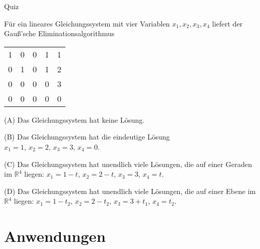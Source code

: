 \documentclass[german]{beamer}
\begin{document}
\begin{frame}{Quiz}

F\"ur ein lineares Gleichungssystem mit vier Variablen $x_1, x_2, x_3, x_4$
liefert der Gau{\ss}'sche Eliminationsalgorithmus
\begin{center}
\begin{tabular}{rrrr|r}
 1 &  0 &  0 & 1 & 1 \\
 0 &  1 &  0 & 1 & 2 \\
 0 &  0 &  0 & 0 & 3\\
 0 &  0 &  0 & 0 & 0\\
\end{tabular}
\end{center}

{\small
\vspace*{2mm}
(A) Das Gleichungssystem hat keine L\"osung.

\vspace*{2mm}
(B) Das Gleichungssystem hat die eindeutige L\"osung \\ $x_1=1$, $x_2=2$, $x_3=3$, $x_4=0$.

\vspace*{2mm}
(C) Das Gleichungssystem hat unendlich viele L\"osungen, die auf einer Geraden im $\mathbb{R}^4$ liegen:
$x_1=1-t$, $x_2=2-t$, $x_3=3$, $x_4=t$.

\vspace*{2mm}
(D) Das Gleichungssystem hat unendlich viele L\"osungen, die auf einer Ebene im $\mathbb{R}^4$ liegen:
$x_1=1-t_2$, $x_2=2-t_2$, $x_3=3+t_1$, $x_4=t_2$.
}

\end{frame}


\section{Anwendungen}

\frame{\sectionpage}
\end{document}
